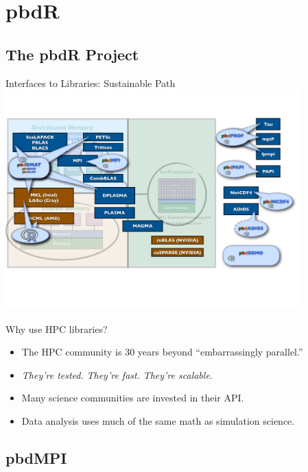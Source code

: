 \section{pbdR}
\makesubcontentsslides

\subsection{The pbdR Project}
\makesubcontentsslidessec

\begin{frame}{\pbdR Interfaces to Libraries: Sustainable Path}
  \vspace{-1ex}
  \centering\includegraphics[trim=0cm 5cm 0cm 3cm,clip=true,width=0.85\textwidth]
  {../common/pics/hardware/ParallelHardware27.pdf}
  \scriptsize
  \begin{block}{Why use HPC libraries?}
    \begin{itemize}[<+-|alert@+>]
    \item The HPC community is 30 years beyond ``embarrassingly parallel.''
    \item \emph{They're tested.} \emph{They're
        fast.}  \emph{They're scalable.}
    \item Many science communities are invested in their API.
    \item Data analysis uses much of the same math as simulation science.
    \end{itemize}
  \end{block}
\end{frame}

\subsection{pbdMPI}
\makesubcontentsslidessec

